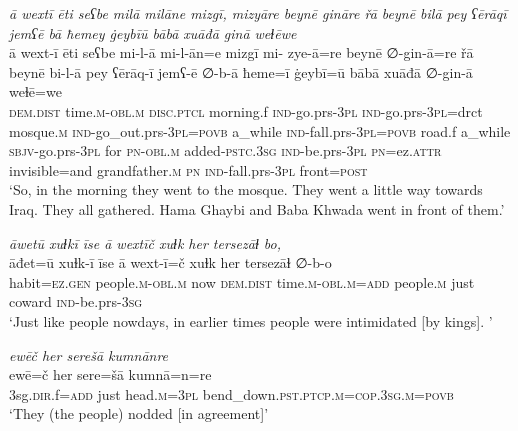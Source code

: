 \ea \label{BP.98}
\textit{ā wextī ēti seʕbe milā milāne mizgī, mizyāre beynē gināre řā beynē bilā pey ʕērāqī jemʕē bā ħemey ġeybīū bābā xuāđā ginā weɫēwe} \\ 
\gll ā wext-ī ēti seʕbe mi-l-ā mi-l-ān=e mizgī mi- zye-ā=re beynē ∅-gin-ā=re řā beynē bi-l-ā pey ʕērāq-ī jemʕ-ē ∅-b-ā ħeme=ī ġeybī=ū bābā xuāđā ∅-gin-ā weɫē=we \\ 
 \textsc{dem.dist} time\textsc{.m}\textsc{-obl}\textsc{.m} \textsc{disc.ptcl} morning.f \textsc{ind-}go.prs\textsc{-3pl} \textsc{ind-}go.prs\textsc{-3pl}=drct mosque\textsc{.m} \textsc{ind-}go\_out.prs\textsc{-3pl}\textsc{=\textsc{povb}} a\_while \textsc{ind-}fall.prs\textsc{-3pl}\textsc{=\textsc{povb}} road.f a\_while \textsc{sbjv-}go.prs\textsc{-3pl} for \textsc{pn}\textsc{-obl}\textsc{.m} added\textsc{-pstc}\textsc{.3sg} \textsc{ind-}be.prs\textsc{-3pl} \textsc{pn}=ez.\textsc{attr} invisible=and grandfather\textsc{.m} \textsc{pn} \textsc{ind-}fall.prs\textsc{-3pl} front\textsc{=\textsc{post}} \\ 
\glt `So, in the morning they went to the mosque. They went a little way towards Iraq. They all gathered. Hama Ghaybi and Baba Khwada went in front of them.'
\z 
 
\ea \label{BP.100}
\textit{āwetū xuɫkī īse ā wextīč xuɫk her tersezāɫ bo,} \\ 
\gll āđet=ū xuɫk-ī īse ā wext-ī=č xuɫk her tersezāɫ ∅-b-o \\ 
 habit\textsc{=ez.gen} people\textsc{.m}\textsc{-obl}\textsc{.m} now \textsc{dem.dist} time\textsc{.m}\textsc{-obl}\textsc{.m}\textsc{=add} people\textsc{.m} just coward \textsc{ind-}be.prs\textsc{-3sg} \\ 
\glt `Just like people nowdays, in earlier times people were intimidated [by kings]. '
\z 
 
\ea \label{BP.104}
\textit{ewēč her serešā kumnānre} \\ 
\gll ewē=č her sere=šā kumnā=n=re \\ 
 3sg\textsc{.dir}.f\textsc{=add} just head\textsc{.m}\textsc{=3pl} bend\_down\textsc{.pst}\textsc{.ptcp}\textsc{.m}\textsc{=cop}\textsc{.3sg}\textsc{.m}\textsc{=\textsc{povb}} \\ 
\glt `They (the people) nodded [in agreement]'
\z 
 
